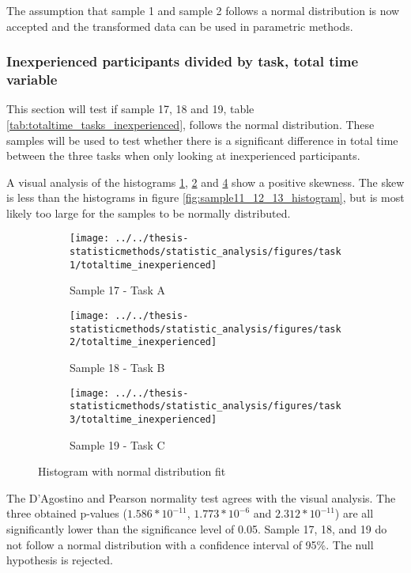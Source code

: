 The assumption that sample 1 and sample 2 follows a normal distribution is now accepted and the transformed data can be used in parametric methods.



\subsubsection[Sample 17, 18 and 19]{Inexperienced participants divided by task, total time variable}\label{sec:sample_17,18,19_normalitytest}
This section will test if sample 17, 18 and 19, table \ref{tab:totaltime_tasks_inexperienced}, follows the normal distribution. These samples will be used to test whether there is a significant difference in total time between the three tasks when only looking at inexperienced participants.

A visual analysis of the histograms \ref{fig:totaltimeinexperienced_task1}, \ref{fig:totaltimeinexperienced_task2} and \ref{fig:totaltimeinexperienced_task3} show a positive skewness. The skew is less than the histograms in figure \ref{fig:sample11_12_13_histogram}, but is most likely too large for the samples to be normally distributed.

\begin{figure}[H]
	\centering
	\begin{subfigure}[b]{0.32\textwidth}
		\centering
		\texttt{[image: ../../thesis-statisticmethods/statistic\_analysis/figures/task1/totaltime\_inexperienced]}
		\caption{Sample 17 - Task A}
		\label{fig:totaltimeinexperienced_task1}
	\end{subfigure}
	\begin{subfigure}[b]{0.32\textwidth}
		\centering
		\texttt{[image: ../../thesis-statisticmethods/statistic\_analysis/figures/task2/totaltime\_inexperienced]}
		\caption{Sample 18 - Task B}
		\label{fig:totaltimeinexperienced_task2}
	\end{subfigure}
	\begin{subfigure}[b]{0.32\textwidth}
		\centering
		\texttt{[image: ../../thesis-statisticmethods/statistic\_analysis/figures/task3/totaltime\_inexperienced]}
		\caption{Sample 19 - Task C}
		\label{fig:totaltimeinexperienced_task3}
	\end{subfigure}
	\caption{Histogram with normal distribution fit}
\end{figure}

The D'Agostino and Pearson normality test agrees with the visual analysis. The three obtained p-values ($1.586 * 10^{-11}$, $1.773 * 10^{-6}$ and $2.312 * 10 ^{-11}$) are all significantly lower than the significance level of 0.05. Sample 17, 18, and 19 do not follow a normal distribution with a confidence interval of 95\%. The null hypothesis is rejected. 

